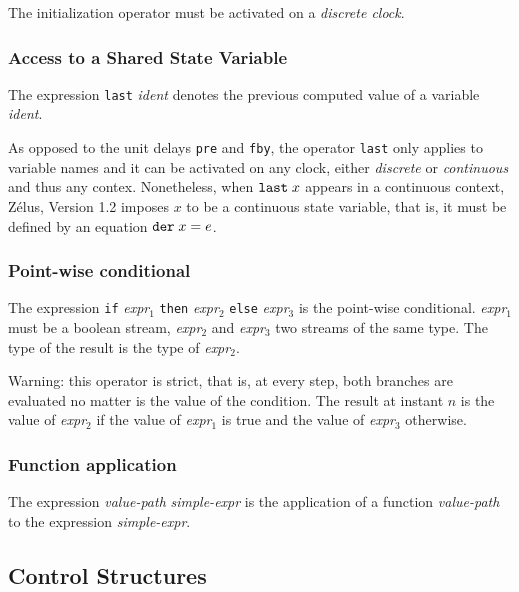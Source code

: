 \documentclass[11pt,titlepage,twoside]{report}
\newcommand{\zelus}{{\sf Z\'elus}}
\newcommand{\If}{\mbox{{\tt if}}}
\newcommand{\Then}{\mbox{{\tt then}}}
\newcommand{\Else}{\mbox{{\tt else}}}
\newcommand{\Pre}{\mbox{{\tt pre}}}
\newcommand{\Last}{\mbox{{\tt last}}}
\newcommand{\Fby}{\mbox{{\tt fby}}}
\newcommand{\term}[1]{{\tt #1}}
\newcommand{\nterm}[1]{{\em #1}}
\begin{document}
The initialization operator must be activated on a \emph{discrete clock}.

\subsubsection{Access to a Shared State Variable} %

The expression \term{\Last} \nterm{ident} denotes the previous computed value
of a variable \nterm{ident}.

As opposed to the unit delays \term{\Pre} and \term{\Fby}, the
operator \term{\Last} only applies to variable names and it can be activated
on any clock, either \emph{discrete} or \emph{continuous} and thus
any contex. Nonetheless, when $\term{\Last}\; x$ appears in a continuous context,
\zelus, Version 1.2 imposes $x$ to be a continuous state variable, that is,
it must be defined by an equation $\term{der}\; x = e$.

\subsubsection{Point-wise conditional} %

The expression \term{\If} \nterm{expr}$_1$ \term{\Then}
\nterm{expr}$_2$ \term{\Else} \nterm{expr}$_3$ is the point-wise
conditional. \nterm{expr}$_1$ must be a boolean stream,
\nterm{expr}$_2$ and \nterm{expr}$_3$ two streams of the same
type. The type of the result is the type of \nterm{expr}$_2$.

Warning: this operator is strict, that is, at every step, both branches
are evaluated no matter is the value of the condition. The result at instant
$n$ is the value of \nterm{expr}$_2$ if the value of \nterm{expr}$_1$ is true and
the value of \nterm{expr}$_3$ otherwise.

\subsubsection{Function application} %

The expression \nterm{value-path} \nterm{simple-expr} is the application
of a function \nterm{value-path} to the expression \nterm{simple-expr}.

\subsection{Control Structures\label{controlstructures}} %
\end{document}
